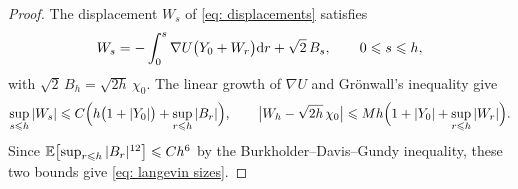 \begin{proof}
	The displacement $W_s$ of \eqref{eq: displacements} satisfies
    \begin{equation}
        W_s = -\int_0^s \nabla U\bigl( Y_0 + W_r \bigr) \mathrm{d} r + \sqrt2\, B_s , \qquad 0 \leqslant s \leqslant h ,
        \label{eq: displacement equation}
    \end{equation}
    with $\sqrt2\, B_h = \sqrt{2h}\, \chi_0$. The linear growth of $\nabla U$ and Gr\"onwall's inequality give
    \begin{equation*}
        \sup_{s \leqslant h} |W_s| \leqslant C \Bigl( h \bigl( 1 + |Y_0| \bigr) + \sup_{r \leqslant h} |B_r| \Bigr) , \qquad
        \bigl| W_h - \sqrt{2h}\, \chi_0 \bigr| \leqslant Mh \Bigl( 1 + |Y_0| + \sup_{r \leqslant h} |W_r| \Bigr) .
    \end{equation*}
    Since $\mathbb E \bigl[ \sup_{r \leqslant h} |B_r|^{12} \bigr] \leqslant C h^{6}$ by the Burkholder--Davis--Gundy inequality, these two bounds give \eqref{eq: langevin sizes}.


\end{proof}
